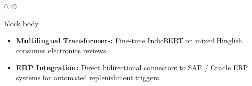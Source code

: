 \documentclass[aspectratio=169, 10pt]{beamer}
\newenvironment{card}[1][]{%
        \begin{beamercolorbox}[rounded=true,shadow=false,wd=\linewidth,sep=3.5pt,#1]{block body}%
        \fontsize{7.8pt}{9.8pt}\selectfont%
    }{%
        \end{beamercolorbox}%
    }
\begin{document}
\begin{frame}[t]
\begin{columns}[T]
\begin{column}{0.49\textwidth}
\begin{card}
                    \begin{itemize}\setlength{\itemsep}{2pt}                                                                                                                                           
                        \item \textbf{Multilingual Transformers:} Fine-tune IndicBERT on mixed Hinglish consumer electronics reviews.                                                                  
                        \item \textbf{ERP Integration:} Direct bidirectional connectors to SAP / Oracle ERP systems for automated replenishment triggers.                                              
                    \end{itemize}                                                                                                                                                                      
                \end{card}                                                                                                                                                                             
            \end{column}                                                                                                                                                                               
        \end{columns}                                                                                                                                                                                  
    \end{frame}                                                                                                                                                                                        
                                                                                                                                                                                                       
\end{document}
